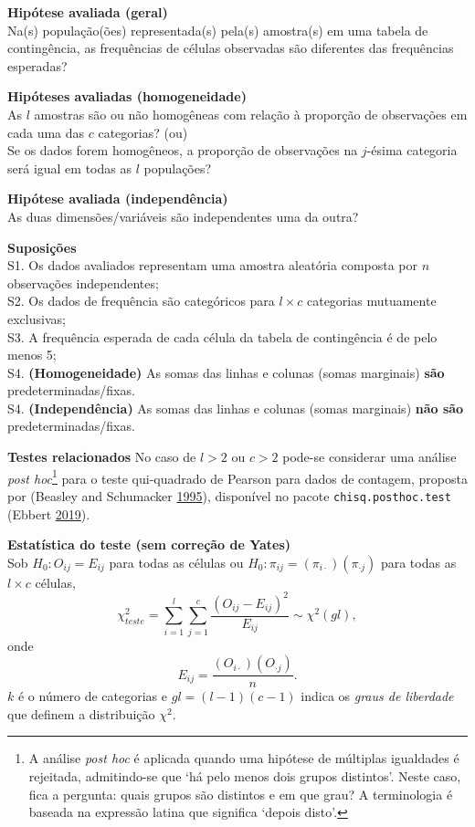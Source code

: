 \documentclass[
]{book}
\theoremstyle{definition}
\theoremstyle{definition}
\theoremstyle{definition}
\theoremstyle{remark}
\begin{document}
\textbf{Hipótese avaliada (geral)}\\
Na(s) população(ões) representada(s) pela(s) amostra(s) em uma tabela de contingência, as frequências de células observadas são diferentes das frequências esperadas?

\textbf{Hipóteses avaliadas (homogeneidade)}\\
As \(l\) amostras são ou não homogêneas com relação à proporção de observações em cada uma das \(c\) categorias? (ou)\\
Se os dados forem homogêneos, a proporção de observações na \(j\)-ésima categoria será igual em todas as \(l\) populações?

\textbf{Hipótese avaliada (independência)}\\
As duas dimensões/variáveis são independentes uma da outra?

\textbf{Suposições}\\
S1. Os dados avaliados representam uma amostra aleatória composta por \(n\) observações independentes;\\
S2. Os dados de frequência são categóricos para \(l \times c\) categorias mutuamente exclusivas;\\
S3. A frequência esperada de cada célula da tabela de contingência é de pelo menos 5;\\
S4. \textbf{(Homogeneidade)} As somas das linhas e colunas (somas marginais) \textbf{são} predeterminadas/fixas.\\
S4. \textbf{(Independência)} As somas das linhas e colunas (somas marginais) \textbf{não são} predeterminadas/fixas.

\textbf{Testes relacionados}
No caso de \(l>2\) ou \(c>2\) pode-se considerar uma análise \emph{post hoc}\footnote{A análise \emph{post hoc} é aplicada quando uma hipótese de múltiplas igualdades é rejeitada, admitindo-se que `há pelo menos dois grupos distintos'. Neste caso, fica a pergunta: quais grupos são distintos e em que grau? A terminologia é baseada na expressão latina que significa `depois disto'.} para o teste qui-quadrado de Pearson para dados de contagem, proposta por (Beasley and Schumacker \protect\hyperlink{ref-beasley1995multiple}{1995}), disponível no pacote \texttt{chisq.posthoc.test} (Ebbert \protect\hyperlink{ref-ebbert2019chisq}{2019}).

\textbf{Estatística do teste (sem correção de Yates)}\\
Sob \(H_0: O_{ij}=E_{ij}\) para todas as células ou \(H_0: \pi_{ij}=(\pi_{i\cdot})(\pi_{\cdot j})\) para todas as \(l \times c\) células,
\begin{equation}
\chi_{teste}^2 = \sum_{i=1}^{l} \sum_{j=1}^{c} \frac{(O_{ij}-E_{ij})^2}{E_{ij}} \sim \chi^2(gl),
\label{eq:qui-teste-qui-bi}
\end{equation}
onde
\begin{equation}
E_{ij}=\frac{(O_{i \cdot})(O_{\cdot j})}{n}.
\label{eq:valor-esperado}
\end{equation}
\(k\) é o número de categorias e \(gl=(l-1)(c-1)\) indica os \emph{graus de liberdade} que definem a distribuição \(\chi^2\).
\end{document}
